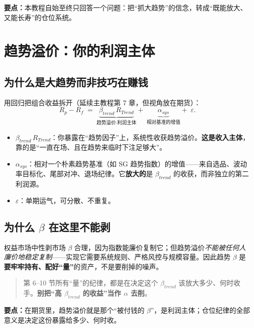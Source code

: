 \documentclass[UTF8,11pt]{ctexart}
\newcommand{\takeaway}[1]{\medskip\par\noindent\textbf{要点：}#1\par\medskip}
\begin{document}
\takeaway{本教程自始至终只回答一个问题：把“抓大趋势”的信念，转成“既能放大、又能长寿”的仓位系统。}

\section{趋势溢价：你的利润主体}
\subsection{为什么是大趋势而非技巧在赚钱}
用回归把组合收益拆开（延续主教程第 7 章，但视角放在期货）：
\begin{equation}
R_p-R_f \;=\; \underbrace{\beta_{trend}\,R_{Trend}}_{\text{趋势溢价·利润主体}}
+\; \underbrace{\alpha_{sys}}_{\text{相对基准的增值}} +\; \varepsilon .
\end{equation}
\begin{itemize}[itemsep=2pt]
\item $\beta_{trend}\,R_{Trend}$：你暴露在“趋势因子”上，系统性收获趋势溢价。\textbf{这是收入主体}，靠的是“一直在场、且在趋势来临时下注足够大”。
\item $\alpha_{sys}$：相对一个朴素趋势基准（如 SG 趋势指数）的增值——来自选品、波动率目标化、尾部对冲、退场纪律。它\textbf{放大的}是 $\beta_{trend}$ 的收获，而非独立的第二利润源。
\item $\varepsilon$：单期运气，可分散、不重复。
\end{itemize}
\subsection{为什么 $\beta$ 在这里不能剥}
权益市场中性剥市场 $\beta$ 合理，因为指数能廉价复制它；但趋势溢价\emph{不能被任何人廉价地稳定复制}——实现它需要系统规则、严格风控与规模容量。因此趋势 $\beta$ 是\textbf{要牢牢持有、配好“量”}的资产，不是要削掉的噪声。
\begin{quote}
第 6--10 节所有“量”的纪律，都是在决定这个 $\beta_{trend}$ 该放大多少、何时收手。\textbf{别把“高 $\beta_{trend}$ 的收益”当作 $\alpha$ 去削}。
\end{quote}

\takeaway{在期货里，趋势溢价就是那个“被付钱的 $\beta$”，是利润主体；仓位纪律的全部意义是决定这份暴露给多少、何时收。}
\end{document}
